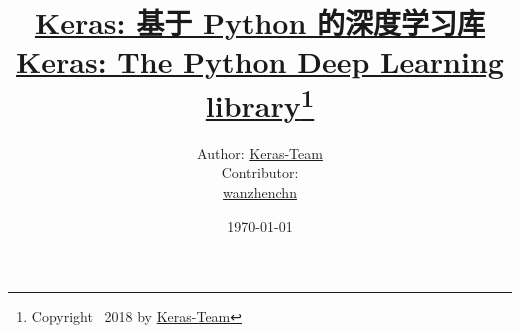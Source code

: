 \documentclass[11pt,a4paper,titlepage]{ctexart}
\begin{document}

\title{\huge \href{https://github.com/Godblesswz/keras-docs-zh}{Keras: 基于 Python 的深度学习库 \\ Keras: The Python Deep Learning library}\thanks{Copyright \textcopyright\ 2018 by \href{https://github.com/keras-team}{Keras-Team}}\vspace{0.7cm}}
\author{\Large Author: \href{https://github.com/keras-team}{Keras-Team}\vspace{0.2cm}\\
Contributor: \Large{} \vspace{0.2cm}\\
{\color{blue}\faGithub}\hspace{0.1cm} {\href{https://github.com/wanzhenchn}{wanzhenchn}}\\
{\color{blue}\faEnvelopeO} 
\vspace{0.6cm}}
\date{\today}

\maketitle






\begingroup    %
\tableofcontents %
\endgroup
\clearpage
{}%



\end{document}
